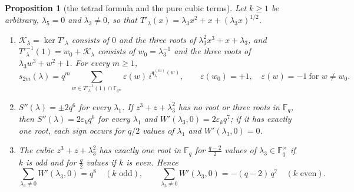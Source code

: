 \documentclass[12pt,a4paper]{amsart}
\newtheorem{proposition}[theorem]{Proposition}
\theoremstyle{definition}
\newcommand{\F}{\mathbb{F}}
\newcommand{\eps}{\varepsilon}
\newcommand{\Kk}{\mathcal{K}}
\newcommand{\qq}{\mathfrak{q}}
\newcommand{\Spp}{S''}
\begin{document}
\begin{proposition}[the tetrad formula and the pure cubic terms]\label{prop:tetrad}
Let $k\ge1$ be arbitrary, $\lambda_5=0$ and $\lambda_3\ne0$, so that $T'_\lambda(x)=\lambda_3x^2+x+(\lambda_3x)^{1/2}$.
\begin{enumerate}[label=\textup{(\roman*)},leftmargin=2em]
\item $\Kk_\lambda=\ker T'_\lambda$ consists of $0$ and the three roots of $\lambda_3^2x^3+x+\lambda_3$, and $T'^{-1}_\lambda(1)=w_0+\Kk_\lambda$ consists of $w_0=\lambda_3^{-1}$ and the three roots of $\lambda_3w^3+w^2+1$. For every $m\ge1$,
\[
s_{2m}(\lambda)=q^m\sum_{w\in T'^{-1}_\lambda(1)\cap\F_{q^m}}\eps(w)\,i^{\qq^{(m)}_\lambda(w)},\qquad \eps(w_0)=+1,\quad\eps(w)=-1\ \text{for }w\ne w_0 .
\]
\item $\Spp(\lambda)=\pm2q^6$ for every $\lambda_1$. If $z^3+z+\lambda_3^2$ has no root or three roots in $\F_q$, then $\Spp(\lambda)=2\eps_kq^6$ for every $\lambda_1$ and $W'(\lambda_3,0)=2\eps_kq^7$; if it has exactly one root, each sign occurs for $q/2$ values of $\lambda_1$ and $W'(\lambda_3,0)=0$.
\item The cubic $z^3+z+\lambda_3^2$ has exactly one root in $\F_q$ for $\frac{q-2}2$ values of $\lambda_3\in\F_q^\times$ if $k$ is odd and for $\frac q2$ values if $k$ is even. Hence
\[
\sum_{\lambda_3\ne0}W'(\lambda_3,0)=q^8\quad(k\text{ odd}),\qquad \sum_{\lambda_3\ne0}W'(\lambda_3,0)=-(q-2)\,q^7\quad(k\text{ even}).
\]
\end{enumerate}
\end{proposition}
\end{document}
